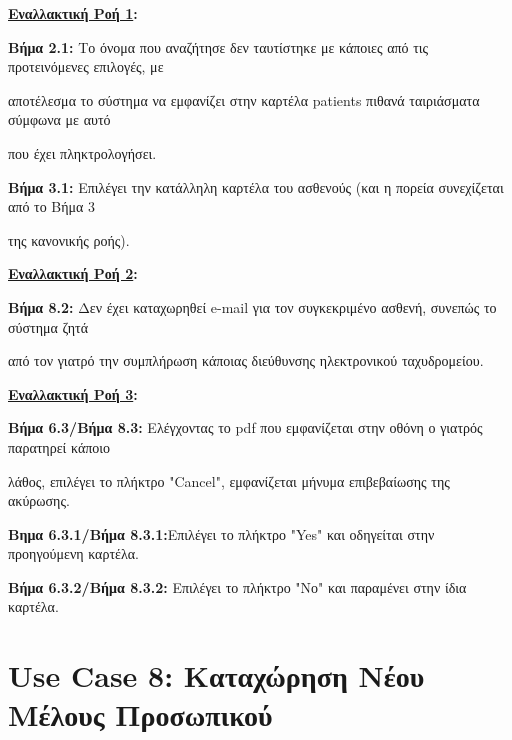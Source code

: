 \documentclass{article}
\begin{document}
\vspace{0.2cm}

\textbf{\underline{Εναλλακτική Ροή 1}:} \newline
\par \textbf{Βήμα 2.1:} Το όνομα που αναζήτησε δεν ταυτίστηκε με κάποιες από τις προτεινόμενες επιλογές, με \par αποτέλεσμα το σύστημα να εμφανίζει στην καρτέλα patients πιθανά ταιριάσματα σύμφωνα με αυτό \par που έχει πληκτρολογήσει.
\vspace{0.2cm}
\par \textbf{Βήμα 3.1:} Επιλέγει την κατάλληλη καρτέλα του ασθενούς (και η πορεία συνεχίζεται από το Βήμα 3 \par της κανονικής ροής).

\vspace{0.3cm}

\textbf{\underline{Εναλλακτική Ροή 2}:} \newline
\par \textbf{Βήμα 8.2:} Δεν έχει καταχωρηθεί e-mail για τον συγκεκριμένο ασθενή, συνεπώς το σύστημα ζητά \par από τον γιατρό την συμπλήρωση κάποιας διεύθυνσης ηλεκτρονικού ταχυδρομείου.

\vspace{0.3cm}

\textbf{\underline{Εναλλακτική Ροή 3}:} \newline
\par \textbf{Βήμα 6.3/Βήμα 8.3:} Ελέγχοντας το pdf που εμφανίζεται στην οθόνη ο γιατρός παρατηρεί κάποιο \par λάθος, επιλέγει το πλήκτρο "Cancel", εμφανίζεται μήνυμα επιβεβαίωσης της ακύρωσης.

\vspace{0.2cm}

\par \textbf{Βημα 6.3.1/Βήμα 8.3.1:}Επιλέγει το πλήκτρο "Yes" και οδηγείται στην προηγούμενη καρτέλα.

\vspace{0.2cm}

\par \textbf{Βήμα 6.3.2/Βήμα 8.3.2:} Επιλέγει το πλήκτρο "Νο" και παραμένει στην ίδια καρτέλα.

\section{Use Case 8: Καταχώρηση Νέου Μέλους Προσωπικού}
\end{document}

